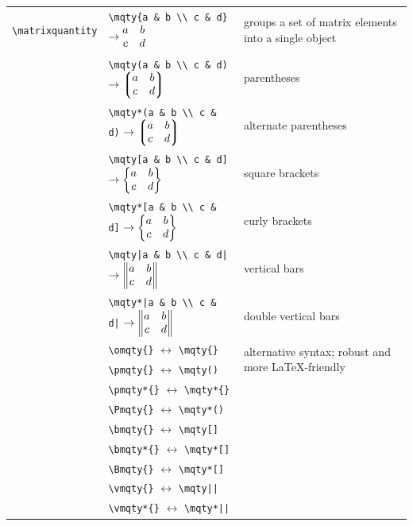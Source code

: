 \documentclass[a4paper,12pt]{article}
\begin{document}
{\fontsize{8pt}{12pt}\selectfont
\begin{longtable}[c]{|p{}|p{}|p{}|}
\hline
\verb|\matrixquantity| & \verb|\mqty{a & b \\ c & d}| $\rightarrow \mqty{a & b \\ c & d}$ & groups a set of matrix elements into a single object \\
& \verb|\mqty(a & b \\ c & d)| $\rightarrow {\mqty(a & b \\ c & d)}$ & parentheses \\
& \verb|\mqty*(a & b \\ c & d)| $\rightarrow {\mqty*(a & b \\ c & d)}$ & alternate parentheses \\
& \verb|\mqty[a & b \\ c & d]| $\rightarrow {\mqty[a & b \\ c & d]}$ & square brackets \\
& \verb|\mqty*[a & b \\ c & d]| $\rightarrow {\mqty*[a & b \\ c & d]}$ & curly brackets \\
& \verb+\mqty|a & b \\ c & d|+ $\rightarrow {\mqty|a & b \\ c & d|}$ & vertical bars \\
& \verb+\mqty*|a & b \\ c & d|+ $\rightarrow {\mqty*|a & b \\ c & d|}$ & double vertical bars \\
& \verb|\omqty{}| $\leftrightarrow$ \verb|\mqty{}| & \multirow{2}{*}{\parbox{6cm}{alternative syntax; robust and more \LaTeX-friendly}} \\
& \verb|\pmqty{}| $\leftrightarrow$ \verb|\mqty()| & \\
& \verb|\pmqty*{}| $\leftrightarrow$ \verb|\mqty*{}| & \\
& \verb|\Pmqty{}| $\leftrightarrow$ \verb|\mqty*()| & \\
& \verb|\bmqty{}| $\leftrightarrow$ \verb|\mqty[]| & \\
& \verb|\bmqty*{}| $\leftrightarrow$ \verb|\mqty*[]| & \\
& \verb|\Bmqty{}| $\leftrightarrow$ \verb|\mqty*[]| & \\
& \verb|\vmqty{}| $\leftrightarrow$ \verb+\mqty||+ & \\
& \verb|\vmqty*{}| $\leftrightarrow$ \verb+\mqty*||+ & \\

\end{longtable}}
\end{document}
